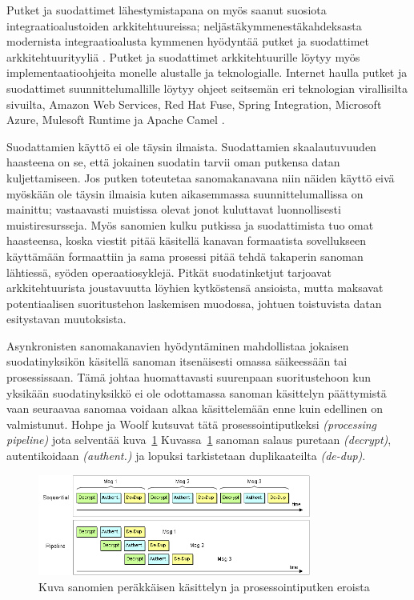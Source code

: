 \begin{itemize}
      Putket ja suodattimet lähestymistapana on myös saanut suosiota integraatioalustoiden arkkitehtuureissa; neljästäkymmenestäkahdeksasta modernista integraatioalusta kymmenen hyödyntää putket ja suodattimet arkkitehtuurityyliä \citep{Freire2019}. Putket ja suodattimet arkkitehtuurille löytyy myös implementaatioohjeita monelle alustalle ja teknologialle. Internet haulla putket ja suodattimet suunnittelumallille löytyy ohjeet seitsemän eri teknologian virallisilta sivuilta, Amazon Web Services, Red Hat Fuse, Spring Integration, Microsoft Azure, Mulesoft Runtime ja Apache Camel \citep{AWSPipes} \citep{RedHatJboss} \citep{SpringPipes} \citep{AzurePipeAndFilt} \citep{MulesoftPat} \citep{CamelPipes}.

      Suodattamien käyttö ei ole täysin ilmaista. Suodattamien skaalautuvuuden haasteena on se, että jokainen suodatin tarvii oman putkensa datan kuljettamiseen. Jos putken toteutetaa sanomakanavana niin näiden käyttö eivä myöskään ole täysin ilmaisia kuten aikasemmassa suunnittelumallissa on mainittu; vastaavasti muistissa olevat jonot kuluttavat luonnollisesti muistiresursseja. Myös sanomien kulku putkissa ja suodattimista tuo omat haasteensa, koska viestit pitää käsitellä kanavan formaatista sovellukseen käyttämään formaattiin ja sama prosessi pitää tehdä takaperin sanoman lähtiessä, syöden operaatiosyklejä. Pitkät suodatinketjut tarjoavat arkkitehtuurista joustavuutta löyhien kytköstensä ansioista, mutta maksavat potentiaalisen suoritustehon laskemisen muodossa, johtuen toistuvista datan esitystavan muutoksista.


      Asynkronisten sanomakanavien hyödyntäminen mahdollistaa jokaisen suodatinyksikön käsitellä sanoman itsenäisesti omassa säikeessään tai prosessissaan. Tämä johtaa huomattavasti suurenpaan suoritustehoon kun yksikään suodatinyksikkö ei ole odottamassa sanoman käsittelyn päättymistä vaan seuraavaa sanomaa voidaan alkaa käsittelemään enne kuin edellinen on valmistunut.
         Hohpe ja Woolf kutsuvat tätä prosessointiputkeksi \textit{(processing pipeline)} jota selventää kuva~\ref{fig:pipelineprocess} \citep{Hohpe2004} \citep{EnterpriseIntegration} 
         Kuvassa~\ref{fig:pipelineprocess} sanoman salaus puretaan \textit{(decrypt)}, autentikoidaan \textit{(authent.)} ja lopuksi tarkistetaan duplikaateilta \textit{(de-dup)}.

      \begin{figure}[h]
      \begin{center}
      \includegraphics[width=0.8\textwidth]{kuvat/pipeline_processing.png}
      \caption{Kuva sanomien peräkkäisen käsittelyn ja prosessointiputken eroista \citep{Hohpe2004}\label{fig:pipelineprocess}}
      \end{center}
      \end{figure}


\end{itemize}
